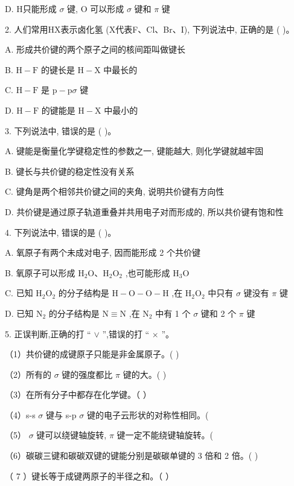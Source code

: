 \documentclass[10pt]{article}
\begin{document}
D. H只能形成 \(\sigma\) 键, \(\mathrm{O}\) 可以形成 \(\sigma\) 键和 \(\pi\) 键

2. 人们常用HX表示卤化氢 (X代表F、Cl、Br、I), 下列说法中, 正确的是 ( )。

A. 形成共价键的两个原子之间的核间距叫做键长

B. \(\mathrm{H} - \mathrm{F}\) 的键长是 \(\mathrm{H} - \mathrm{X}\) 中最长的

C. \(\mathrm{H} - \mathrm{F}\) 是 \(\mathrm{p} - \mathrm{p}\sigma\) 键

D. \(\mathrm{H} - \mathrm{F}\) 的键能是 \(\mathrm{H} - \mathrm{X}\) 中最小的

3. 下列说法中, 错误的是 ( )。

A. 键能是衡量化学键稳定性的参数之一, 键能越大, 则化学键就越牢固

B. 键长与共价键的稳定性没有关系

C. 键角是两个相邻共价键之间的夹角, 说明共价键有方向性

D. 共价键是通过原子轨道重叠并共用电子对而形成的, 所以共价键有饱和性

4. 下列说法中, 错误的是 ( )。

A. 氧原子有两个未成对电子, 因而能形成 2 个共价键

B. 氧原子可以形成 \({\mathrm{H}}_{2}\mathrm{O}\text{、}{\mathrm{H}}_{2}{\mathrm{O}}_{2}\) ,也可能形成 \({\mathrm{H}}_{3}\mathrm{O}\)

C. 已知 \({\mathrm{H}}_{2}{\mathrm{O}}_{2}\) 的分子结构是 \(\mathrm{H} - \mathrm{O} - \mathrm{O} - \mathrm{H}\) ,在 \({\mathrm{H}}_{2}{\mathrm{O}}_{2}\) 中只有 \(\sigma\) 键没有 \(\pi\) 键

D. 已知 \({\mathrm{N}}_{2}\) 的分子结构是 \(\mathrm{N} \equiv \mathrm{N}\) ,在 \({\mathrm{N}}_{2}\) 中有 1 个 \(\sigma\) 键和 2 个 \(\pi\) 键

5. 正误判断,正确的打 “ \(\vee\) ”,错误的打 “ \(\times\) ”。

（1）共价键的成键原子只能是非金属原子。( )

（2）所有的 \(\sigma\) 键的强度都比 \(\pi\) 键的大。( )

（3）在所有分子中都存在化学键。（ ）

（4）s-s \(\sigma\) 键与 s-p \(\sigma\) 键的电子云形状的对称性相同。(

（5） \(\sigma\) 键可以绕键轴旋转, \(\pi\) 键一定不能绕键轴旋转。(

（6）碳碳三键和碳碳双键的键能分别是碳碳单键的 3 倍和 2 倍。( )

（ 7 ）键长等于成键两原子的半径之和。（ ）
\end{document}
